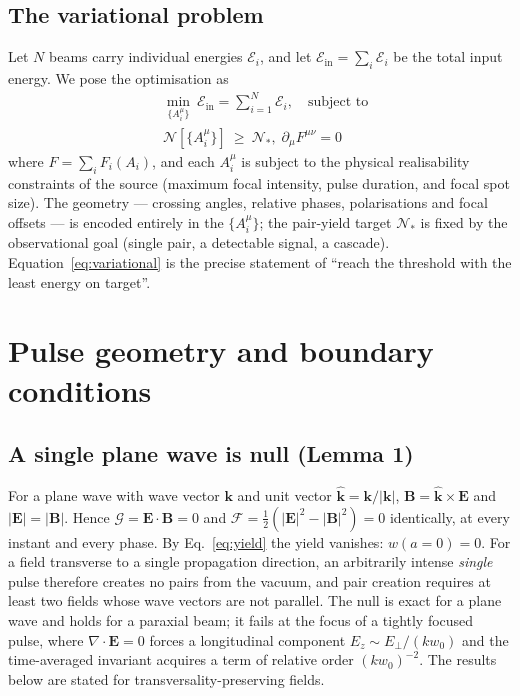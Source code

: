 \documentclass[aps,prd,reprint,superscriptaddress,nofootinbib,floatfix]{revtex4-2}
\begin{document}
\subsection{The variational problem}

Let $N$ beams carry individual energies $\mathcal{E}_i$, and let
$\mathcal{E}_{\mathrm{in}}=\sum_i\mathcal{E}_i$ be the total input energy.
We pose the optimisation as
\begin{equation}
\boxed{\;
\begin{aligned}
&\min_{\{A_i^\mu\}}\ \mathcal{E}_{\mathrm{in}}=\sum_{i=1}^{N}\mathcal{E}_i,
\quad\text{subject to}\\
&\mathcal{N}[\{A_i^\mu\}]\ \ge\ \mathcal{N}_\ast,\;
\partial_\mu F^{\mu\nu}=0
\end{aligned}
\;}
\label{eq:variational}
\end{equation}
where $F=\sum_i F_i(A_i)$, and each $A_i^\mu$ is subject to the physical
realisability constraints of the source (maximum focal intensity, pulse
duration, and focal spot size). The geometry --- crossing angles, relative
phases, polarisations and focal offsets --- is encoded entirely in the
$\{A_i^\mu\}$; the pair-yield target $\mathcal{N}_\ast$ is fixed by the
observational goal (single pair, a detectable signal, a cascade).
Equation~\eqref{eq:variational} is the precise statement of ``reach the
threshold with the least energy on target''.

\section{Pulse geometry and boundary conditions}
\label{sec:geometry}

\subsection{A single plane wave is null (Lemma 1)}

For a plane wave with wave vector $\mathbf{k}$ and unit vector
$\hat{\mathbf{k}}=\mathbf{k}/|\mathbf{k}|$,
$\mathbf{B}=\hat{\mathbf{k}}\times\mathbf{E}$ and
$|\mathbf{E}|=|\mathbf{B}|$. Hence $\mathcal{G}=\mathbf{E}\cdot\mathbf{B}=0$
and $\mathcal{F}=\tfrac12(|\mathbf{E}|^2-|\mathbf{B}|^2)=0$ identically, at
every instant and every phase. By Eq.~\eqref{eq:yield} the yield vanishes:
$w(a=0)=0$. For a field transverse to a single propagation direction, an
arbitrarily intense \emph{single} pulse therefore creates no pairs from the
vacuum, and pair creation requires at least two fields whose wave vectors are
not parallel. The null is exact for a plane wave and holds for a paraxial
beam; it fails at the focus of a tightly focused pulse, where
$\nabla\cdot\mathbf{E}=0$ forces a longitudinal component
$E_z\sim E_\perp/(k w_0)$ and the time-averaged invariant acquires a term of
relative order $(k w_0)^{-2}$. The results below are stated for
transversality-preserving fields.
\end{document}
